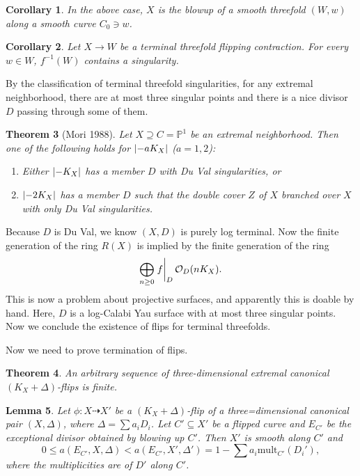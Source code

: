\documentclass[leqno, openany]{memoir}
\newtheorem{thm}{Theorem}[section]
\newtheorem{cor}[thm]{Corollary}
\newtheorem{lem}[thm]{Lemma}
\theoremstyle{definition}
\theoremstyle{remark}
\theoremstyle{plain}
\theoremstyle{definition}
\theoremstyle{remark}
\renewcommand{\P}{\mathbb{P}}
\newcommand{\mc}[1]{\mathcal{#1}}
\begin{document}
\begin{cor}
    In the above case, $X$ is the blowup of a smooth threefold $(W, w)$ along a smooth curve $C_0 \ni w$.
\end{cor}

\begin{cor}
    Let $X \to W$ be a terminal threefold flipping contraction. For every $w \in W$, $f^{-1}(W)$ contains a singularity.
\end{cor}

By the classification of terminal threefold singularities, for any extremal neighborhood, there are at most three singular points and there is a nice divisor $D$ passing through some of them.

\begin{thm}[Mori 1988]
    Let $X \supseteq C = \P^1$ be an extremal neighborhood. Then one of the following holds for $\abs{-aK_X}$ ($a = 1, 2$):
    \begin{enumerate}
        \item Either $\abs{-K_X}$ has a member $D$ with Du Val singularities, or
        \item $\abs{-2K_X}$ has a member $D$ such that the double cover $Z$ of $X$ branched over $X$ with only Du Val singularities.
    \end{enumerate}
\end{thm}

Because $D$ is Du Val, we know $(X, D)$ is purely log terminal. Now the finite generation of the ring $R(X)$ is implied by the finite generation of the ring
\[ \bigoplus_{n \geq 0} \eval{f}_D \mc{O}_D(nK_X). \]
This is now a problem about projective surfaces, and apparently this is doable by hand. Here, $D$ is a log-Calabi Yau surface with at most three singular points. Now we conclude the existence of flips for terminal threefolds.

Now we need to prove termination of flips. 

\begin{thm}
    An arbitrary sequence of three-dimensional extremal canonical $(K_X + \Delta)$-flips is finite.
\end{thm}

\begin{lem}
    Let $\phi \colon X \dashrightarrow X'$ be a $(K_X + \Delta)$-flip of a three=dimensional canonical pair $(X, \Delta)$, where $\Delta = \sum a_i D_i$. Let $C' \subseteq X'$ be a flipped curve and $E_{C'}$ be the exceptional divisor obtained by blowing up $C'$. Then $X'$ is smooth along $C'$ and 
    \[ 0 \leq a(E_{C'}, X, \Delta) < a(E_{C'}, X', \Delta') = 1 - \sum a_i \text{mult}_{C'} (D_i'), \]
    where the multiplicities are of $D'$ along $C'$.
\end{lem}
\end{document}
